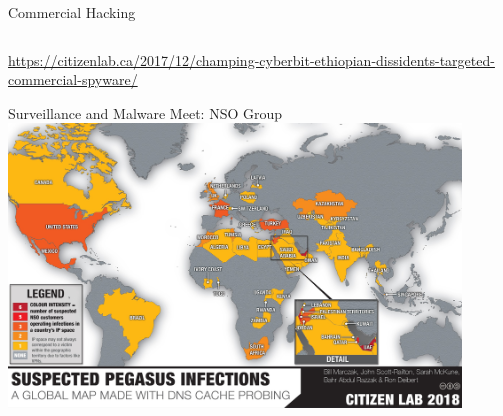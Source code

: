 \documentclass[nobackground,dvipsnames,table,aspectratio=169]{beamer}
\begin{document}
\begin{frame}{Commercial Hacking}
\begin{columns}
    \end{columns}
    \tiny
    \url{https://citizenlab.ca/2017/12/champing-cyberbit-ethiopian-dissidents-targeted-commercial-spyware/}
\end{frame}

\begin{frame}{Surveillance and Malware Meet: NSO Group}
    \includegraphics[width=0.9\textwidth]{pegasus-infection-map}
\end{frame}
\end{document}
